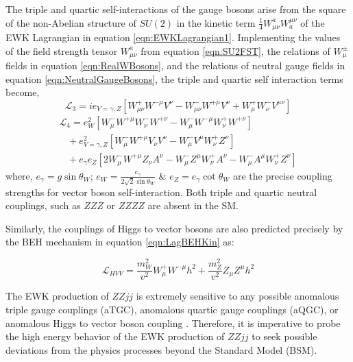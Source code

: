 The triple and quartic self-interactions of the gauge bosons arise from the square of the non-Abelian structure of $SU(2)$ in the kinetic term $ \frac{1}{4} W^{a}_{\mu\nu} W^{\mu\nu}_{a}$ of the EWK Lagrangian in equation \ref{eqn:EWKLagrangian1}. Implementing the values of the field strength tensor $W^{a}_{\mu\nu}$ from equation \ref{eqn:SU2FST}, the relations of $W_{\mu}^{\pm}$ fields in equation \ref{eqn:RealWBosons}, and the relations of neutral gauge fields in equation \ref{eqn:NeutralGaugeBosons}, the triple and quartic self interaction terms become, 
\begin{equation}
\mathcal{L}_{3} = ie_{V=\gamma,Z} [ W^{+}_{\mu\nu} W^{-\mu} V^{\nu} - W^{-}_{\mu\nu} W^{+\mu} V^{\nu} + W_{\mu}^{+}W_{\nu}^{-}V^{\mu\nu} ] 
\label{eqn:L_TGC}
\end{equation}
\begin{equation}
\begin{array}{l}
\mathcal{L}_{4} = e^{2}_{W} [ W^{-}_{\mu}W^{+\mu}W^{-}_{\nu}W^{+\nu} - W^{-}_{\mu}W^{-\mu}W^{+}_{\nu}W^{+\nu} ] \\
 \hspace{10pt} + e^2_{V=\gamma,Z} [ W^{-}_{\mu}W^{+\mu}V_{\nu}V^{\nu} - W^{-}_{\mu}V^{\mu}W^{+}_{\nu}Z^{\nu} ] \\
  \hspace{10pt} + e_{\gamma}e_{Z} [ 2W^{-}_{\mu} W^{+\mu} Z_{\nu}A^{\nu} - W_{\mu}^{-}Z^{\mu}W^{+}_{\nu}A^{\nu} - W_{\mu}^{-}A^{\mu}W^{+}_{\nu}Z^{\nu} ]
\end{array}
\label{eqn:L_QGC}
\end{equation}
where, $e_{\gamma} = g\sin\theta_{W}$; $e_{W} = \frac{e_{\gamma}}{2\sqrt{2}\sin\theta_{W}}$ $\&$ $e_{Z} = e_{\gamma}\cot\theta_{W}$ are the precise coupling strengths for vector boson self-interaction. Both triple and quartic neutral couplings, such as $ZZZ$ or $ZZZZ$ are absent in the SM. 

Similarly, the couplings of Higgs to vector bosons are also predicted precisely by the BEH mechanism in equation \ref{eqn:LagBEHKin} as:

\begin{equation}
\mathcal{L}_{HVV} = \frac{m_{W}^2}{v^2} W^{+}_{\mu}W^{-\mu}h^{2} + \frac{m_{Z}^{2}}{v^2} Z_{\mu}Z^{\mu}h^{2}
\label{eqn:HVVCoupling}
\end{equation}

The EWK production of $ZZjj$ is extremely sensitive to any possible anomalous triple gauge couplings (aTGC), anomalous quartic gauge couplings (aQGC), or anomalous Higgs to vector boson coupling \cite{SensitivityNP} \cite{EboliModelaQGC} \cite{BSM_Simple2HDM}. Therefore, it is imperative to probe the high energy behavior of the EWK production of $ZZjj$ to seek possible deviations from the physics processes beyond the Standard Model (BSM). 

